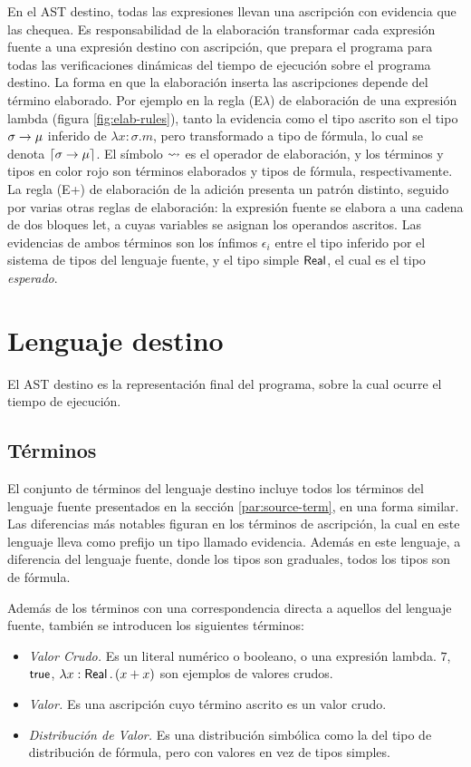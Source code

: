En el AST destino, todas las expresiones llevan una ascripción con evidencia que las chequea. Es responsabilidad de la elaboración transformar cada expresión fuente a una expresión destino con ascripción, que prepara el programa para todas las verificaciones dinámicas del tiempo de ejecución sobre el programa destino. La forma en que la elaboración inserta las ascripciones depende del término elaborado. Por ejemplo en la regla (E$\lambda$) de elaboración de una expresión lambda (figura \ref{fig:elab-rules}), tanto la evidencia como el tipo ascrito son el tipo $\sigma \to \mu$ inferido de $\lambda x : \sigma . m$, pero transformado a tipo de fórmula, lo cual se denota $\lceil {\sigma \to \mu} \rceil$.  El símbolo $\rightsquigarrow$ es el operador de elaboración, y los términos y tipos en color rojo son términos elaborados y tipos de fórmula, respectivamente. La regla (E+) de elaboración de la adición presenta un patrón distinto, seguido por varias otras reglas de elaboración: la expresión fuente se elabora a una cadena de dos bloques {\sffamily let}, a cuyas variables se asignan los operandos ascritos. Las evidencias de ambos términos son los ínfimos $\epsilon_i$ entre el tipo inferido por el sistema de tipos del lenguaje fuente, y el tipo simple $\mathord{\text{\sffamily Real}}$, el cual es el tipo \emph{esperado}.




\label{sec:evidence}


\section{Lenguaje destino}\label{sec:target-language}

El AST destino es la representación final del programa, sobre la cual ocurre el tiempo de ejecución.


\subsection{Términos}\label{par:tplc-terms} El conjunto de términos del lenguaje destino incluye todos los términos del lenguaje fuente presentados en la sección \ref{par:source-term}, en una forma similar. Las diferencias más notables figuran en los términos de ascripción, la cual en este lenguaje lleva como prefijo un tipo llamado evidencia. Además en este lenguaje, a diferencia del lenguaje fuente, donde los tipos son graduales, todos los tipos son de fórmula.

Además de los términos con una correspondencia directa a aquellos del lenguaje fuente, también se introducen los siguientes términos:
\begin{itemize}
\item \emph{Valor Crudo.} Es un literal numérico o booleano, o una expresión lambda. $7$, $\mathord{\text{\sffamily true}}$, $\lambda {x} : {\mathord{\text{\sffamily Real}}} \,.\, {(x + x)}$ son ejemplos de valores crudos.
\item \emph{Valor.} Es una ascripción cuyo término ascrito es un valor crudo.
\item \emph{Distribución de Valor.} Es una distribución simbólica como la del tipo de distribución de fórmula, pero con valores en vez de tipos simples.
\end{itemize}

